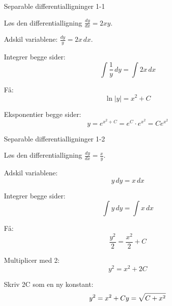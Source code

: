 \documentclass{article}
\begin{document}

\tableofcontents
\newpage

\begin{exercise}{Separable differentialligninger 1-1}

Løs den differentialligning $\frac{dy}{dx} = 2xy$.


\hint

Adskil variablene: $\frac{dy}{y} = 2x \, dx$.

\hint

Integrer begge sider:
\[
\int \frac{1}{y} \, dy = \int 2x \, dx
\]

\hint

Få:
\[
\ln|y| = x^2 + C
\]

\hint

Eksponentier begge sider:
\[
y = e^{x^2 + C} = e^C \cdot e^{x^2} = Ce^{x^2}
\]

\end{exercise}

\newpage

\begin{exercise}{Separable differentialligninger 1-2}

Løs den differentialligning $\frac{dy}{dx} = \frac{x}{y}$.


\hint

Adskil variablene:
\[
y \, dy = x \, dx
\]

\hint

Integrer begge sider:
\[
\int y \, dy = \int x \, dx
\]

\hint

Få:
\[
\frac{y^2}{2} = \frac{x^2}{2} + C
\]

\hint

Multiplicer med 2:
\[
y^2 = x^2 + 2C
\]

\hint

Skriv 2C som en ny konstant:
\[
y^2 = x^2 + C \\ y = \sqrt{C + x^2}
\]

\end{exercise}

\newpage
\end{document}
